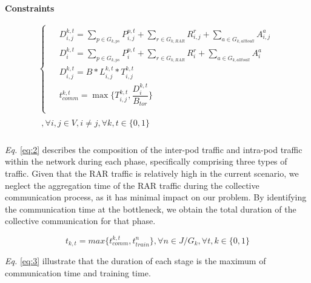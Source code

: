 \documentclass[conference]{IEEEtran}
\begin{document}
\textbf{Constraints}

\begin{equation} \label{eq:2}
	\begin{split}
		\begin{cases}
			\begin{aligned}
				& D^{k, t}_{i,j} = \sum_{p\in G_{k, ps}}P^{p,t}_{i,j} + \sum_{r\in G_{k, RAR}}R^{r}_{i,j} + \sum_{a\in G_{k,alltoall}}A^{a}_{i,j}\\
				& D^{k, t}_i = \sum_{p\in G_{k, ps}}P^{p,t}_{i} + \sum_{r\in G_{k, RAR}}R^{r}_{i} + \sum_{a\in G_{k,alltoall}}A^{a}_{i}\\
				& D_{i,j}^{k,t} = B*L_{i,j}^{k,t}*T_{i,j}^{k,t}\\
				& t_{comm}^{k,t} = \max\{T_{i,j}^{k,t}, \dfrac{D_i^{k, t}}{B_{tor}}\}\\
			\end{aligned}
		\end{cases}\\
		\begin{aligned}
			, \forall i, j\in V, i \neq j, \forall k,t\in \{0,1\}\\
		\end{aligned}
	\end{split}
\end{equation}

\emph{Eq.} \eqref{eq:2} describes the composition of the inter-pod traffic and intra-pod traffic within the network during each phase, specifically comprising three types of traffic. Given that the RAR traffic is relatively high in the current scenario, we neglect the aggregation time of the RAR traffic during the collective communication process, as it has minimal impact on our problem. By identifying the communication time at the bottleneck, we obtain the total duration of the collective communication for that phase.

\begin{equation}\label{eq:3}
	t_{k,t} = max\{t_{comm}^{k,t}, t_{train}^n\}, \forall n \in J/G_k, \forall t,k \in \{0,1\}
\end{equation}

\emph{Eq.} \eqref{eq:3} illustrate that the duration of each stage is the maximum of communication time and training time.
\end{document}
